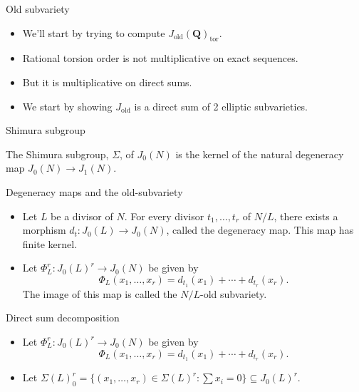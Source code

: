 \documentclass{beamer}
\newcommand{\QQ}{\mathbf{Q}}
\newcommand{\tor}{\mathrm{tor}}
\newcommand{\old}{\mathrm{old}}
\begin{document}
\begin{frame}{Old subvariety}
    \begin{itemize}
        \item
            We'll start by trying to compute $J_\old(\QQ)_\tor$.
            \pause
        \item
            Rational torsion order is not multiplicative on exact sequences.
            \pause
        \item
            But it is multiplicative on direct sums.
            \pause
        \item
            We start by showing $J_\old$ is a direct sum of 2 elliptic
            subvarieties.
    \end{itemize}
\end{frame}

\begin{frame}{Shimura subgroup}
    \begin{definition}
        The Shimura subgroup, $\Sigma$, of $J_0(N)$ is the kernel of the
        natural degeneracy map $J_0(N)\to J_1(N)$.
    \end{definition}
\end{frame}

\begin{frame}{Degeneracy maps and the old-subvariety}
    \begin{itemize}
        \item
            Let $L$ be a divisor of $N$. For every divisor $t_1,\ldots,t_r$ of
            $N/L$, there exists a morphism $d_t:J_0(L)\to J_0(N)$, called the
            degeneracy map. This map has finite kernel.
            \pause
        \item
            Let $\Phi_L ^r: J_0(L)^r \to J_0(N)$ be given by
            \[
                \Phi_L(x_1,\ldots,x_r)=d_{t_1}(x_1)+\cdots+d_{t_r}(x_r).
            \]
            The image of this map is called the $N/L$-old subvariety.
    \end{itemize}
\end{frame}

\begin{frame}{Direct sum decomposition}
    \begin{itemize}
        \item
            Let $\Phi_L ^r: J_0(L)^r \to J_0(N)$ be given by
            \[
                \Phi_L(x_1,\ldots,x_r)=d_{t_1}(x_1)+\cdots+d_{t_r}(x_r).
            \]
        \item
            Let $\Sigma(L)_0 ^r = \{(x_1,\ldots,x_r)\in \Sigma(L)^r: \sum
            x_i=0\}\subseteq J_0(L)^r$.
        \end{itemize}
\end{frame}
\end{document}
